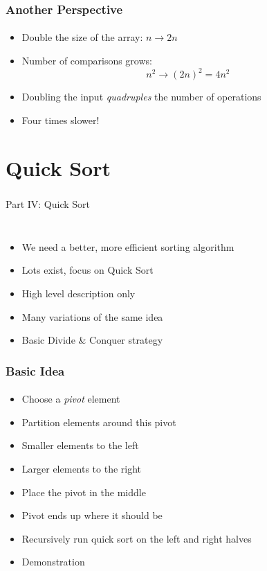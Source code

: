 \documentclass[]{beamer}
\begin{document}
\begin{frame}[fragile]
  \frametitle{Another Perspective}
  \framesubtitle{} 
  
\begin{itemize}[<+->]
  \item Double the size of the array: $n \rightarrow 2n$
  \item Number of comparisons grows:
  	$$n^2 \rightarrow (2n)^2 = 4n^2$$
  \item Doubling the input \emph{quadruples} the number of operations
  \item Four times slower!
\end{itemize}
  
\end{frame}


\section{Quick Sort}

\begin{frame}
    \frametitle{}
    \framesubtitle{}
    
    \begin{center}
    {\Huge Part IV: Quick Sort}\\
    {\Large ~}
    \end{center}

\end{frame}

\begin{frame}[fragile]
  \frametitle{}
  \framesubtitle{}

\begin{itemize}[<+->]
  \item We need a better, more efficient sorting algorithm
  \item Lots exist, focus on Quick Sort
  \item High level description only
  \item Many variations of the same idea
  \item Basic Divide \& Conquer strategy
\end{itemize}

\end{frame}

\begin{frame}[fragile]
  \frametitle{Basic Idea}
  \framesubtitle{}

\begin{itemize}[<+->]
  \item Choose a \emph{pivot} element
  \item Partition elements around this pivot
  \item Smaller elements to the left
  \item Larger elements to the right
  \item Place the pivot in the middle
  \item Pivot ends up where it should be
  \item Recursively run quick sort on the left and right halves
  \item Demonstration
\end{itemize}

\end{frame}
\end{document}
